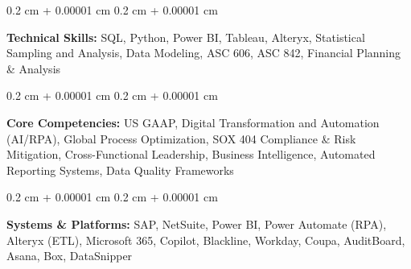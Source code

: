 \documentclass[10pt, letterpaper]{article}
\newenvironment{onecolentry}{
    \begin{adjustwidth}{
        0.2 cm + 0.00001 cm
    }{
        0.2 cm + 0.00001 cm
    }
}{
    \end{adjustwidth}
} %
\begin{document}
        \vspace{0.2 cm}

        \begin{onecolentry}
            \textbf{Technical Skills:} SQL, Python, Power BI, Tableau, Alteryx, Statistical Sampling and Analysis, Data Modeling, ASC 606, ASC 842, Financial Planning \& Analysis
        \end{onecolentry}

        \vspace{0.2 cm}

        \begin{onecolentry}
            \textbf{Core Competencies:} US GAAP, Digital Transformation and Automation (AI/RPA), Global Process Optimization, SOX 404 Compliance \& Risk Mitigation, Cross-Functional Leadership, Business Intelligence, Automated Reporting Systems, Data Quality Frameworks
        \end{onecolentry}

        \vspace{0.2 cm}

        \begin{onecolentry}
            \textbf{Systems \& Platforms:} SAP, NetSuite, Power BI, Power Automate (RPA), Alteryx (ETL), Microsoft 365, Copilot, Blackline, Workday, Coupa, AuditBoard, Asana, Box, DataSnipper
        \end{onecolentry}
\end{document}
